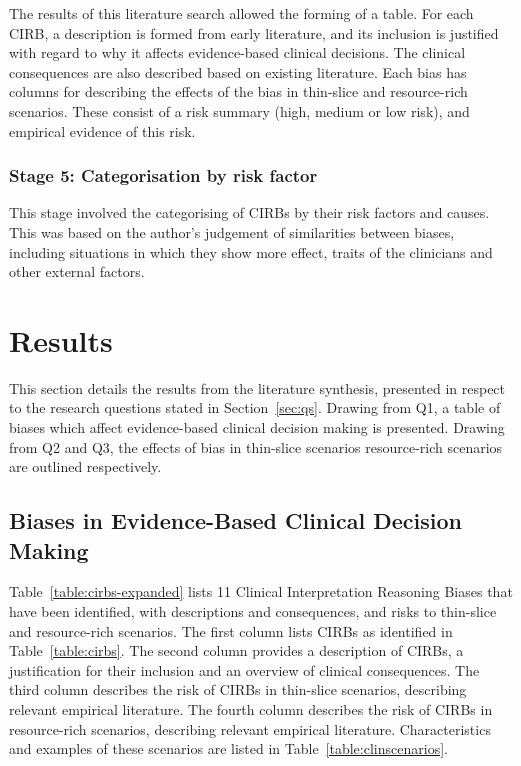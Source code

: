 \documentclass[a4paper]{scrartcl}     %
\newif\ifbreaksection
\begin{document}
    The results of this literature search allowed the forming of a table. For each CIRB, a description is formed from early literature, and its inclusion is justified with regard to why it affects evidence-based clinical decisions. The clinical consequences are also described based on existing literature. Each bias has columns for describing the effects of the bias in thin-slice and resource-rich scenarios. These consist of a  risk summary (high, medium or low risk), and empirical evidence of this risk.

  \subsubsection*{Stage 5: Categorisation by risk factor}

    This stage involved the categorising of CIRBs by their risk factors and causes. This was based on the author's judgement of similarities between biases, including situations in which they show more effect, traits of the clinicians and other external factors.


\ifbreaksection\clearpage\fi\section{Results} %

  This section details the results from the literature synthesis, presented in respect to the research questions stated in Section~\ref{sec:qs}. Drawing from Q1, a table of biases which affect evidence-based clinical decision making is presented. Drawing from Q2 and Q3, the effects of bias in thin-slice scenarios resource-rich scenarios are outlined respectively.

  \subsection{Biases in Evidence-Based Clinical Decision Making}

    Table~\ref{table:cirbs-expanded} lists 11 Clinical Interpretation Reasoning Biases that have been identified, with descriptions and consequences, and risks to thin-slice and resource-rich scenarios. The first column lists CIRBs as identified in Table~\ref{table:cirbs}. The second column provides a description of CIRBs, a justification for their inclusion and an overview of clinical consequences. The third column describes the risk of CIRBs in thin-slice scenarios, describing relevant empirical literature. The fourth column describes the risk of CIRBs in resource-rich scenarios, describing relevant empirical literature. Characteristics and examples of these scenarios are listed in Table~\ref{table:clinscenarios}.
\end{document}
